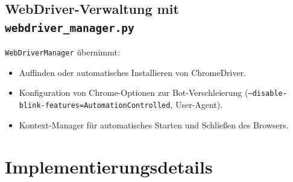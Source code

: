 \documentclass[12pt, a4paper]{report} %
\begin{document}
\subsection{WebDriver-Verwaltung mit \texttt{webdriver\_manager.py}}
\texttt{WebDriverManager} übernimmt:
\begin{itemize}
  \item Auffinden oder automatisches Installieren von ChromeDriver.  
  \item Konfiguration von Chrome-Optionen zur Bot-Verschleierung (\texttt{--disable-blink-features=AutomationControlled}, User-Agent).  
  \item Kontext-Manager für automatisches Starten und Schließen des Browsers.  
\end{itemize}

\section{Implementierungsdetails}
\end{document}

